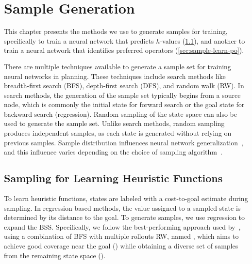 \documentclass[ppgc,diss,english]{iiufrgs}
\begin{document}
\chapter{Sample Generation}
\label{cha:sample-gen}
This chapter presents the methods we use to generate samples for training, specifically to train a neural network that predicts $h$-values (\cref{sec:sample-learn-h}), and another to train a neural network that identifies preferred operators (\cref{sec:sample-learn-po}).

There are multiple techniques available to generate a sample set for training neural networks in planning. These techniques include search methods like breadth-first search (BFS), depth-first search (DFS), and random walk (RW). In search methods, the generation of the sample set typically begins from a source node, which is commonly the initial state for forward search or the goal state for backward search (regression). Random sampling of the state space can also be used to generate the sample set. Unlike search methods, random sampling produces independent samples, as each state is generated without relying on previous samples. Sample distribution influences neural network generalization~\cite{Ferber.etal/2020a}, and this influence varies depending on the choice of sampling algorithm~\cite{Bettker.etal/2022}.

\section{Sampling for Learning Heuristic Functions}
\label{sec:sample-learn-h}
To learn heuristic functions, states are labeled with a cost-to-goal estimate during sampling. In regression-based methods, the value assigned to a sampled state is determined by its distance to the goal. To generate samples, we use regression to expand the BSS. Specifically, we follow the best-performing approach used by~\citet{Bettker.etal/2022}, using a combination of BFS with multiple rollouts RW, named \bfsrw, which aims to achieve good coverage near the goal (\bfs) while obtaining a diverse set of samples from the remaining state space (\rw).
\end{document}
